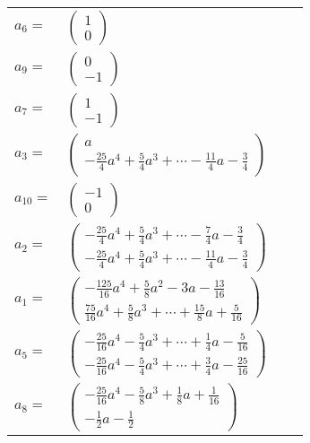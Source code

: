 \documentclass[1p]{elsarticle_modified}
\theoremstyle{definition}
\begin{document}
\begin{tabular}{m{7pt} m{180pt} m{7pt} m{180pt} }
\flushright $a_{6}=$&$\begin{pmatrix}1\\0\end{pmatrix}$ \\
\flushright $a_{9}=$&$\begin{pmatrix}0\\-1\end{pmatrix}$ \\
\flushright $a_{7}=$&$\begin{pmatrix}1\\-1\end{pmatrix}$ \\
\flushright $a_{3}=$&$\begin{pmatrix}a\\-\frac{25}{4} a^4+\frac{5}{4} a^3+\cdots-\frac{11}{4} a-\frac{3}{4}\end{pmatrix}$ \\
\flushright $a_{10}=$&$\begin{pmatrix}-1\\0\end{pmatrix}$ \\
\flushright $a_{2}=$&$\begin{pmatrix}-\frac{25}{4} a^4+\frac{5}{4} a^3+\cdots-\frac{7}{4} a-\frac{3}{4}\\-\frac{25}{4} a^4+\frac{5}{4} a^3+\cdots-\frac{11}{4} a-\frac{3}{4}\end{pmatrix}$ \\
\flushright $a_{1}=$&$\begin{pmatrix}-\frac{125}{16} a^4+\frac{5}{8} a^2-3 a-\frac{13}{16}\\\frac{75}{16} a^4+\frac{5}{8} a^3+\cdots+\frac{15}{8} a+\frac{5}{16}\end{pmatrix}$ \\
\flushright $a_{5}=$&$\begin{pmatrix}-\frac{25}{16} a^4-\frac{5}{4} a^3+\cdots+\frac{1}{4} a-\frac{5}{16}\\-\frac{25}{16} a^4-\frac{5}{4} a^3+\cdots+\frac{3}{4} a-\frac{25}{16}\end{pmatrix}$ \\
\flushright $a_{8}=$&$\begin{pmatrix}-\frac{25}{16} a^4-\frac{5}{8} a^3+\frac{1}{8} a+\frac{1}{16}\\-\frac{1}{2} a-\frac{1}{2}\end{pmatrix}$ \\

\end{tabular}
\end{document}
